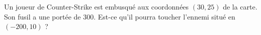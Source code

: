 
\begin{exercice}\label{exosmath-0474}

    Un joueur de Counter-Strike est embusqué aux coordonnées \( (30,25)\) de la carte. Son fusil a une portée de \unit{300}{\meter}. Est-ce qu'il pourra toucher l'ennemi situé en \( (-200,10)\) ?

\end{exercice}
